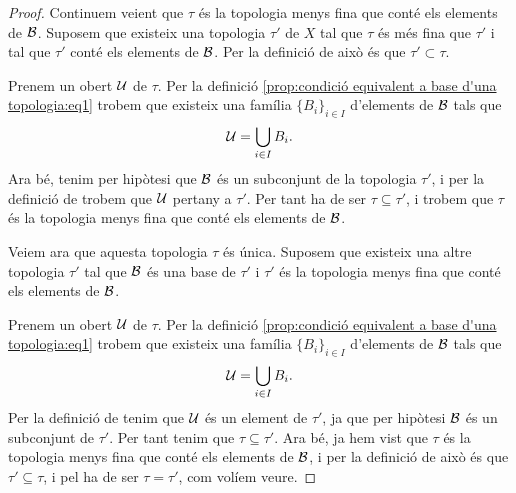 \documentclass[../Apunts.tex]{subfiles}
\begin{document}
\begin{proposition}
\begin{proof}
			Continuem veient que \(\tau\) és la topologia menys fina que conté els elements de \(\mathcal{B}\). Suposem que existeix una topologia \(\tau'\) de \(X\) tal que \(\tau\) és més fina que \(\tau'\) i tal que \(\tau'\) conté els elements de \(\mathcal{B}\). Per la definició de  això és que \(\tau'\subset\tau\).
			
			Prenem un obert \(\mathcal{U}\) de \(\tau\). Per la definició \eqref{prop:condició equivalent a base d'una topologia:eq1} trobem que existeix una família \(\{B_{i}\}_{i\in I}\) d'elements de \(\mathcal{B}\) tals que
			\[\mathcal{U}=\bigcup_{i\in I}B_{i}.\]
			Ara bé, tenim per hipòtesi que \(\mathcal{B}\) és un subconjunt de la topologia \(\tau'\), i per la definició de  trobem que \(\mathcal{U}\) pertany a \(\tau'\). Per tant ha de ser \(\tau\subseteq\tau'\), i trobem que \(\tau\) és la topologia menys fina que conté els elements de \(\mathcal{B}\).
			
			Veiem ara que aquesta topologia \(\tau\) és única. Suposem que existeix una altre topologia \(\tau'\) tal que \(\mathcal{B}\) és una base de \(\tau'\) i \(\tau'\) és la topologia menys fina que conté els elements de \(\mathcal{B}\).
			
			Prenem un obert \(\mathcal{U}\) de \(\tau\). Per la definició \eqref{prop:condició equivalent a base d'una topologia:eq1} trobem que existeix una família \(\{B_{i}\}_{i\in I}\) d'elements de \(\mathcal{B}\) tals que
			\[\mathcal{U}=\bigcup_{i\in I}B_{i}.\]
			Per la definició de  tenim que \(\mathcal{U}\) és un element de \(\tau'\), ja que per hipòtesi \(\mathcal{B}\) és un subconjunt de \(\tau'\). Per tant tenim que \(\tau\subseteq\tau'\). Ara bé, ja hem vist que \(\tau\) és la topologia menys fina que conté els elements de \(\mathcal{B}\), i per la definició de  això és que \(\tau'\subseteq\tau\), i pel  ha de ser \(\tau=\tau'\), com volíem veure.
		\end{proof}
	\end{proposition}
\end{document}
